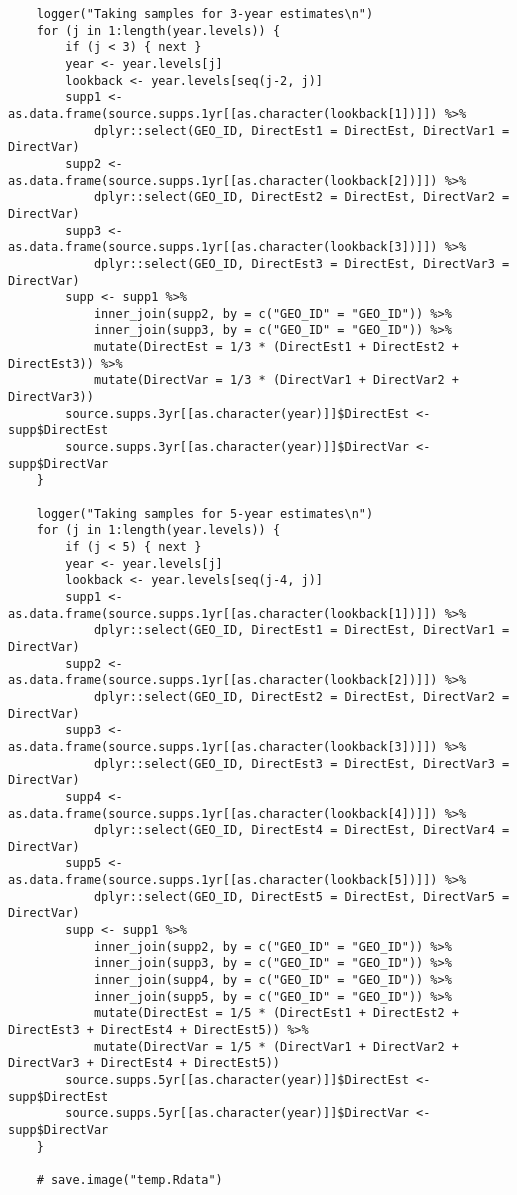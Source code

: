 \documentclass[12pt]{article}
\begin{document}
\begin{scriptsize}
\begin{verbatim}
	logger("Taking samples for 3-year estimates\n")
	for (j in 1:length(year.levels)) {
		if (j < 3) { next }
		year <- year.levels[j]
		lookback <- year.levels[seq(j-2, j)]
		supp1 <- as.data.frame(source.supps.1yr[[as.character(lookback[1])]]) %>%
			dplyr::select(GEO_ID, DirectEst1 = DirectEst, DirectVar1 = DirectVar)
		supp2 <- as.data.frame(source.supps.1yr[[as.character(lookback[2])]]) %>%
			dplyr::select(GEO_ID, DirectEst2 = DirectEst, DirectVar2 = DirectVar)
		supp3 <- as.data.frame(source.supps.1yr[[as.character(lookback[3])]]) %>%
			dplyr::select(GEO_ID, DirectEst3 = DirectEst, DirectVar3 = DirectVar)
		supp <- supp1 %>%
			inner_join(supp2, by = c("GEO_ID" = "GEO_ID")) %>%
			inner_join(supp3, by = c("GEO_ID" = "GEO_ID")) %>%
			mutate(DirectEst = 1/3 * (DirectEst1 + DirectEst2 + DirectEst3)) %>%
			mutate(DirectVar = 1/3 * (DirectVar1 + DirectVar2 + DirectVar3))
		source.supps.3yr[[as.character(year)]]$DirectEst <- supp$DirectEst
		source.supps.3yr[[as.character(year)]]$DirectVar <- supp$DirectVar
	}

	logger("Taking samples for 5-year estimates\n")
	for (j in 1:length(year.levels)) {
		if (j < 5) { next }
		year <- year.levels[j]
		lookback <- year.levels[seq(j-4, j)]
		supp1 <- as.data.frame(source.supps.1yr[[as.character(lookback[1])]]) %>%
			dplyr::select(GEO_ID, DirectEst1 = DirectEst, DirectVar1 = DirectVar)
		supp2 <- as.data.frame(source.supps.1yr[[as.character(lookback[2])]]) %>%
			dplyr::select(GEO_ID, DirectEst2 = DirectEst, DirectVar2 = DirectVar)
		supp3 <- as.data.frame(source.supps.1yr[[as.character(lookback[3])]]) %>%
			dplyr::select(GEO_ID, DirectEst3 = DirectEst, DirectVar3 = DirectVar)
		supp4 <- as.data.frame(source.supps.1yr[[as.character(lookback[4])]]) %>%
			dplyr::select(GEO_ID, DirectEst4 = DirectEst, DirectVar4 = DirectVar)
		supp5 <- as.data.frame(source.supps.1yr[[as.character(lookback[5])]]) %>%
			dplyr::select(GEO_ID, DirectEst5 = DirectEst, DirectVar5 = DirectVar)
		supp <- supp1 %>%
			inner_join(supp2, by = c("GEO_ID" = "GEO_ID")) %>%
			inner_join(supp3, by = c("GEO_ID" = "GEO_ID")) %>%
			inner_join(supp4, by = c("GEO_ID" = "GEO_ID")) %>%
			inner_join(supp5, by = c("GEO_ID" = "GEO_ID")) %>%
			mutate(DirectEst = 1/5 * (DirectEst1 + DirectEst2 + DirectEst3 + DirectEst4 + DirectEst5)) %>%
			mutate(DirectVar = 1/5 * (DirectVar1 + DirectVar2 + DirectVar3 + DirectEst4 + DirectEst5))
		source.supps.5yr[[as.character(year)]]$DirectEst <- supp$DirectEst
		source.supps.5yr[[as.character(year)]]$DirectVar <- supp$DirectVar
	}

	# save.image("temp.Rdata")


\end{verbatim}
\end{scriptsize}
\end{document}
